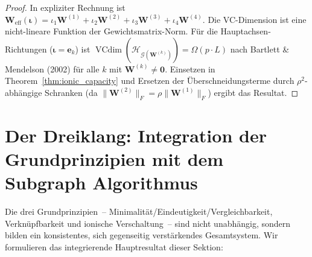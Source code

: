 \documentclass[12pt, a4paper, openany]{report}
\newcommand{\calG}{\mathcal{G}}
\newcommand{\calH}{\mathcal{H}}
\DeclareMathOperator{\VC}{VCdim}
\begin{document}
\begin{proof}
In expliziter Rechnung ist $\bm{W}_{\mathrm{eff}}(\bm{\iota}) = \iota_1
\bm{W}^{(1)} + \iota_2 \bm{W}^{(2)} + \iota_3 \bm{W}^{(3)} + \iota_4 \bm{W}^{(4)}$.
Die VC-Dimension ist eine nicht-lineare Funktion der Gewichtsmatrix-Norm.
Für die Hauptachsen-Richtungen ($\bm{\iota} = \bm{e}_k$) ist
$\VC(\calH_{\calG(\bm{W}^{(k)})}) = \Omega(p \cdot L)$ nach
Bartlett \& Mendelson (2002) für alle $k$ mit $\bm{W}^{(k)} \neq \bm{0}$.
Einsetzen in Theorem~\ref{thm:ionic_capacity} und Ersetzen der
Überschneidungsterme durch $\rho^2$-abhängige Schranken
(da $\|\bm{W}^{(2)}\|_F = \rho \|\bm{W}^{(1)}\|_F$) ergibt das Resultat.
\end{proof}

\section{Der Dreiklang: Integration der Grundprinzipien mit dem Subgraph Algorithmus}
\label{sec:bio_integration}

Die drei Grundprinzipien~-- Minimalität/Eindeutigkeit/Vergleichbarkeit,
Verknüpfbarkeit und ionische Verschaltung~-- sind nicht unabhängig, sondern
bilden ein konsistentes, sich gegenseitig verstärkendes Gesamtsystem.  Wir
formulieren das integrierende Hauptresultat dieser Sektion:
\end{document}
